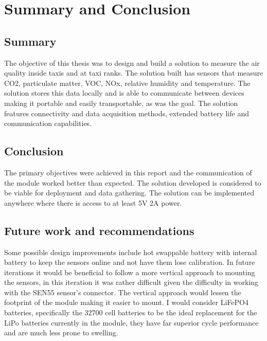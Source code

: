 \graphicspath{{conclusion/fig/}}

\chapter{Summary and Conclusion}
\label{chap:conclusion}
\section{Summary}

The objective of this thesis was to design and build a solution to measure the air quality inside taxis and at taxi ranks. The solution built has sensors that measure CO2, particulate matter, VOC, NOx, relative humidity and temperature. The solution stores this data locally and is able to communicate between devices making it portable and easily transportable, as was the goal. The solution features connectivity and data acquisition methods, extended battery life and communication capabilities.


\section{Conclusion}
\noindent
The primary objectives were achieved in this report and the communication of the module worked better than expected. The solution developed is considered to be viable for deployment and data gathering. The solution can be implemented anywhere where there is access to at least 5V 2A power.
\section{Future work and recommendations}
Some possible design improvements include hot swappable battery with internal battery to keep the sensors online and not have them lose calibration. In future iterations it would be beneficial to follow a more vertical approach to mounting the sensors, in this iteration it was rather difficult given the difficulty in working with the SEN55 sensor's connector. The vertical approach would lessen the footprint of the module making it easier to mount. I would consider LiFePO4 batteries, specifically the 32700 cell batteries to be the ideal replacement for the LiPo batteries currently in the module, they have far superior cycle performance and are much less prone to swelling.